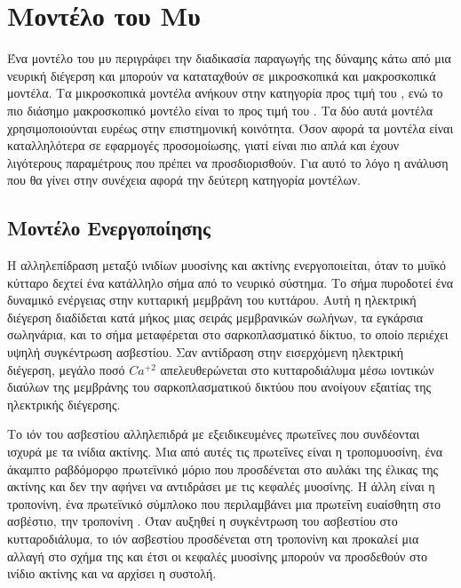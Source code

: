 \section{Μοντέλο του Μυ}

Ένα μοντέλο του μυ περιγράφει την διαδικασία παραγωγής της δύναμης κάτω από μια νευρική διέγερση και μπορούν να καταταχθούν σε μικροσκοπικά και μακροσκοπικά μοντέλα. Τα μικροσκοπικά μοντέλα ανήκουν στην κατηγορία  προς τιμή του , ενώ το πιο διάσημο μακροσκοπικό μοντέλο είναι το  προς τιμή του . Τα δύο αυτά μοντέλα χρησιμοποιούνται ευρέως στην επιστημονική κοινότητα. Όσον αφορά τα μοντέλα  είναι καταλληλότερα σε εφαρμογές προσομοίωσης, γιατί είναι πιο απλά και έχουν λιγότερους παραμέτρους που πρέπει να προσδιορισθούν. Για αυτό το λόγο η ανάλυση που θα γίνει στην συνέχεια αφορά την δεύτερη κατηγορία μοντέλων.

\subsection{Μοντέλο Ενεργοποίησης}

Η αλληλεπίδραση μεταξύ ινιδίων μυοσίνης και ακτίνης ενεργοποιείται, όταν το μυϊκό κύτταρο δεχτεί ένα κατάλληλο σήμα από το νευρικό σύστημα. Το σήμα πυροδοτεί ένα δυναμικό ενέργειας στην κυτταρική μεμβράνη του κυττάρου. Αυτή η ηλεκτρική διέγερση διαδίδεται κατά μήκος μιας σειράς μεμβρανικών σωλήνων, τα εγκάρσια σωληνάρια, και το σήμα μεταφέρεται στο σαρκοπλασματικό δίκτυο, το οποίο περιέχει υψηλή συγκέντρωση ασβεστίου. Σαν αντίδραση στην εισερχόμενη ηλεκτρική διέγερση, μεγάλο ποσό $Ca^{+2}$ απελευθερώνεται στο κυτταροδιάλυμα μέσω ιοντικών διαύλων της μεμβράνης του σαρκοπλασματικού δικτύου που ανοίγουν εξαιτίας της ηλεκτρικής διέγερσης.

Το ιόν του ασβεστίου αλληλεπιδρά με εξειδικευμένες πρωτεΐνες που συνδέονται ισχυρά με τα ινίδια ακτίνης. Μια από αυτές τις πρωτεΐνες είναι η τροπομυοσίνη, ένα άκαμπτο ραβδόμορφο πρωτεϊνικό μόριο που προσδένεται στο αυλάκι της έλικας της ακτίνης και δεν την αφήνει να αντιδράσει με τις κεφαλές μυοσίνης. Η άλλη είναι η τροπονίνη, ένα πρωτεϊνικό σύμπλοκο που περιλαμβάνει μια πρωτεΐνη ευαίσθητη στο ασβέστιο, την τροπονίνη . Όταν αυξηθεί η συγκέντρωση του ασβεστίου στο κυτταροδιάλυμα, το ιόν ασβεστίου προσδένεται στη τροπονίνη και προκαλεί μια αλλαγή στο σχήμα της και έτσι οι κεφαλές μυοσίνης μπορούν να προσδεθούν στο ινίδιο ακτίνης και να αρχίσει η συστολή.

